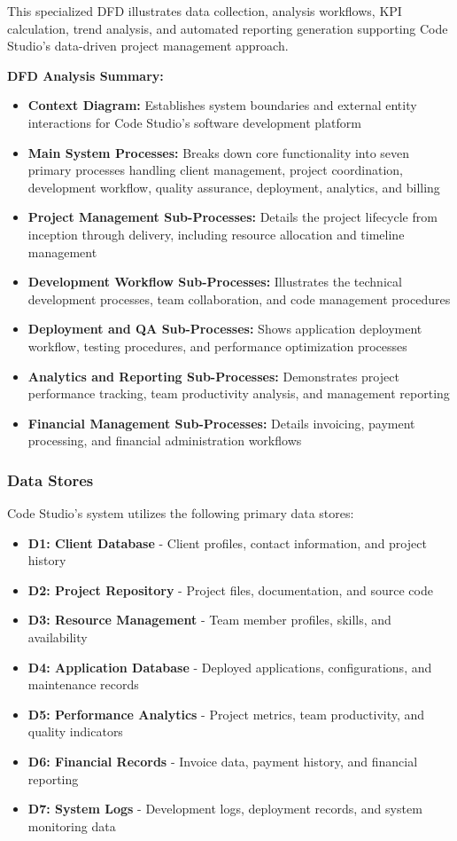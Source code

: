 \documentclass[12pt,a4paper]{article}
\begin{document}
This specialized DFD illustrates data collection, analysis workflows, KPI calculation, trend analysis, and automated reporting generation supporting Code Studio's data-driven project management approach.

\vspace{0.5cm}
{\color{orange!80}\large\textbf{DFD Analysis Summary:}}

\begin{itemize}
\item \textbf{Context Diagram:} Establishes system boundaries and external entity interactions for Code Studio's software development platform
\item \textbf{Main System Processes:} Breaks down core functionality into seven primary processes handling client management, project coordination, development workflow, quality assurance, deployment, analytics, and billing
\item \textbf{Project Management Sub-Processes:} Details the project lifecycle from inception through delivery, including resource allocation and timeline management
\item \textbf{Development Workflow Sub-Processes:} Illustrates the technical development processes, team collaboration, and code management procedures
\item \textbf{Deployment and QA Sub-Processes:} Shows application deployment workflow, testing procedures, and performance optimization processes
\item \textbf{Analytics and Reporting Sub-Processes:} Demonstrates project performance tracking, team productivity analysis, and management reporting
\item \textbf{Financial Management Sub-Processes:} Details invoicing, payment processing, and financial administration workflows
\end{itemize}

\subsubsection{Data Stores}

Code Studio's system utilizes the following primary data stores:

\begin{itemize}
\item \textbf{D1: Client Database} - Client profiles, contact information, and project history
\item \textbf{D2: Project Repository} - Project files, documentation, and source code
\item \textbf{D3: Resource Management} - Team member profiles, skills, and availability
\item \textbf{D4: Application Database} - Deployed applications, configurations, and maintenance records
\item \textbf{D5: Performance Analytics} - Project metrics, team productivity, and quality indicators
\item \textbf{D6: Financial Records} - Invoice data, payment history, and financial reporting
\item \textbf{D7: System Logs} - Development logs, deployment records, and system monitoring data
\end{itemize}
\end{document}
